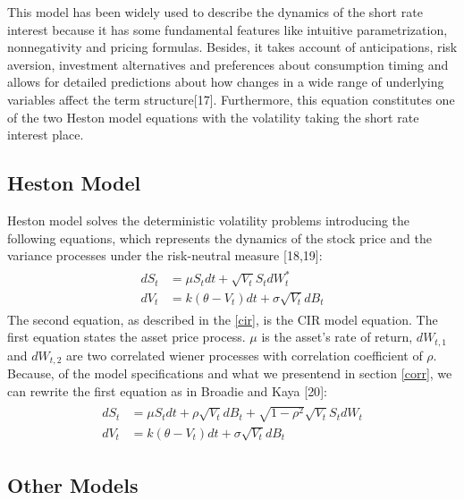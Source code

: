 \documentclass[12pt,twoside]{reedthesis}
\theoremstyle{definition}
\theoremstyle{definition}
\theoremstyle{remark}
\begin{document}
  This model has been widely used to describe the dynamics of the short
  rate interest because it has some fundamental features like intuitive
  parametrization, nonnegativity and pricing formulas. Besides, it takes
  account of anticipations, risk aversion, investment alternatives and
  preferences about consumption timing and allows for detailed predictions
  about how changes in a wide range of underlying variables affect the
  term structure{[}17{]}. Furthermore, this equation constitutes one of
  the two Heston model equations with the volatility taking the short rate
  interest place.
  
  \subsection{Heston Model}\label{heston-model}
  
  Heston model solves the deterministic volatility problems introducing
  the following equations, which represents the dynamics of the stock
  price and the variance processes under the risk-neutral measure
  {[}18,19{]}:
  \begin{align}
  \label{eq:heston}
  \begin{split}
  dS_t &= \mu S_t dt + \sqrt{V_t} S_t dW^*_t \\
  dV_t &= k(\theta - V_t)dt + \sigma \sqrt{V_t} dB_t
  \end{split}
  \end{align}
  The second equation, as described in the \ref{cir}, is the CIR model
  equation. The first equation states the asset price process. \(\mu\) is
  the asset's rate of return, \(dW_{t,1}\) and \(dW_{t,2}\) are two
  correlated wiener processes with correlation coefficient of \(\rho\).
  Because, of the model specifications and what we presentend in section
  \ref{corr}, we can rewrite the first equation as in Broadie and Kaya
  {[}20{]}:
  \begin{align}
  \label{eq:heston2}
  \begin{split}
  dS_t &= \mu S_t dt + \rho \sqrt{V_t} dB_t + \sqrt{1 - \rho^2} \sqrt{V_t} S_t dW_t \\
  dV_t &= k(\theta - V_t)dt + \sigma \sqrt{V_t} dB_t
  \end{split}
  \end{align}
  \subsection{Other Models}\label{other-models}
  
\end{document}
